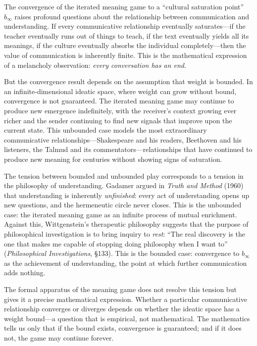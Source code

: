 \begin{interpretation}
\label{interp:ch14:convergence_philosophy}
The convergence of the iterated meaning game to a ``cultural saturation
point'' $b_\infty$ raises profound questions about the relationship between
communication and understanding.  If every communicative relationship
eventually saturates---if the teacher eventually runs out of things to teach,
if the text eventually yields all its meanings, if the culture eventually
absorbs the individual completely---then the value of communication is
inherently finite.  This is the mathematical expression of a melancholy
observation: \emph{every conversation has an end}.

But the convergence result depends on the assumption that weight is bounded.
In an infinite-dimensional ideatic space, where weight can grow without
bound, convergence is not guaranteed.  The iterated meaning game may
continue to produce new emergence indefinitely, with the receiver's context
growing ever richer and the sender continuing to find new signals that
improve upon the current state.  This unbounded case models the most
extraordinary communicative relationships---Shakespeare and his readers,
Beethoven and his listeners, the Talmud and its commentators---relationships
that have continued to produce new meaning for centuries without showing
signs of saturation.

The tension between bounded and unbounded play corresponds to a tension in
the philosophy of understanding.  Gadamer argued in \emph{Truth and Method}
(1960) that understanding is inherently \emph{unfinished}: every act of
understanding opens up new questions, and the hermeneutic circle never
closes.  This is the unbounded case: the iterated meaning game as an
infinite process of mutual enrichment.  Against this, Wittgenstein's
therapeutic philosophy suggests that the purpose of philosophical
investigation is to bring inquiry to \emph{rest}: ``The real discovery is
the one that makes me capable of stopping doing philosophy when I want to''
(\emph{Philosophical Investigations}, \S133).  This is the bounded case:
convergence to $b_\infty$ as the achievement of understanding, the point at
which further communication adds nothing.

The formal apparatus of the meaning game does not resolve this tension but
gives it a precise mathematical expression.  Whether a particular
communicative relationship converges or diverges depends on whether the
ideatic space has a weight bound---a question that is empirical, not
mathematical.  The mathematics tells us only that if the bound exists,
convergence is guaranteed; and if it does not, the game may continue forever.
\end{interpretation}

